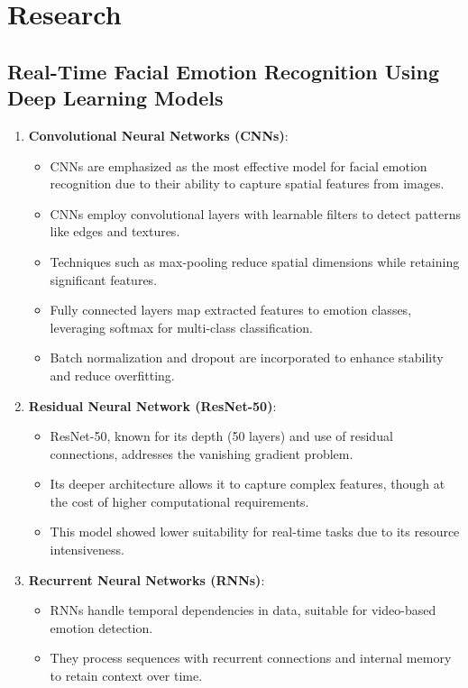 \documentclass{article}
\begin{document}
\section*{Research}

\subsection*{Real-Time Facial Emotion Recognition Using Deep Learning Models}

\begin{enumerate}
    \item \textbf{Convolutional Neural Networks (CNNs)}:
    \begin{itemize}
        \item CNNs are emphasized as the most effective model for facial emotion recognition due to their ability to capture spatial features from images.
        \item CNNs employ convolutional layers with learnable filters to detect patterns like edges and textures.
        \item Techniques such as max-pooling reduce spatial dimensions while retaining significant features.
        \item Fully connected layers map extracted features to emotion classes, leveraging softmax for multi-class classification.
        \item Batch normalization and dropout are incorporated to enhance stability and reduce overfitting.
    \end{itemize}
    \item \textbf{Residual Neural Network (ResNet-50)}:
    \begin{itemize}
        \item ResNet-50, known for its depth (50 layers) and use of residual connections, addresses the vanishing gradient problem.
        \item Its deeper architecture allows it to capture complex features, though at the cost of higher computational requirements.
        \item This model showed lower suitability for real-time tasks due to its resource intensiveness.
    \end{itemize}
    \item \textbf{Recurrent Neural Networks (RNNs)}:
    \begin{itemize}
        \item RNNs handle temporal dependencies in data, suitable for video-based emotion detection.
        \item They process sequences with recurrent connections and internal memory to retain context over time.

\end{itemize}
\end{enumerate}
\end{document}

